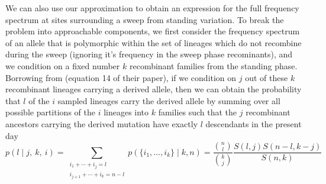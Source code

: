 \documentclass[a4paper,10pt]{article}
\begin{document}
We can also use our approximation to obtain an expression for the full frequency spectrum at sites surrounding a sweep from standing variation. To break the problem into approachable components, we first consider the frequency spectrum of an allele that is polymorphic within the set of lineages which do not recombine during the sweep (ignoring it's frequency in the sweep phase recominants), and we condition on a fixed number $k$ recombinant families from the standing phase. Borrowing from \cite{Pennings2006} (equation 14 of their paper), if we condition on $j$ out of these $k$ recombinant lineages carrying a derived allele, then we can obtain the probability that $l$ of the $i$ sampled lineages carry the derived allele by summing over all possible partitions of the $i$ lineages into $k$ families such that the $j$ recombinant ancestors carrying the derived mutation have exactly $l$ descendants in the present day
\begin{equation}
p(l \mid j, ~k,~i) = \sum_{\substack{i_1+\cdots +i_j=l \\i_{j+1}+\cdots + i_k=n-l}} p(\{i_1,\dots,i_k\} \mid k, n) = \frac{ {n \choose l} }{ {k \choose j} }\frac{ S(l,j)  S(n-l,k-j)  }{ S(n,k) } \label{ESF_gives_freq_spec}
\end{equation}
\end{document}
